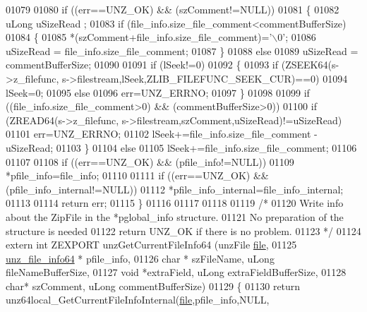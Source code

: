 \begin{DoxyCode}
01079 
01080     \textcolor{keywordflow}{if} ((err==UNZ\_OK) && (szComment!=NULL))
01081     \{
01082         uLong uSizeRead ;
01083         \textcolor{keywordflow}{if} (file\_info.size\_file\_comment<commentBufferSize)
01084         \{
01085             *(szComment+file\_info.size\_file\_comment)=\textcolor{charliteral}{'\(\backslash\)0'};
01086             uSizeRead = file\_info.size\_file\_comment;
01087         \}
01088         \textcolor{keywordflow}{else}
01089             uSizeRead = commentBufferSize;
01090 
01091         \textcolor{keywordflow}{if} (lSeek!=0)
01092         \{
01093             \textcolor{keywordflow}{if} (ZSEEK64(s->z\_filefunc, s->filestream,lSeek,ZLIB\_FILEFUNC\_SEEK\_CUR)==0)
01094                 lSeek=0;
01095             \textcolor{keywordflow}{else}
01096                 err=UNZ\_ERRNO;
01097         \}
01098 
01099         \textcolor{keywordflow}{if} ((file\_info.size\_file\_comment>0) && (commentBufferSize>0))
01100             \textcolor{keywordflow}{if} (ZREAD64(s->z\_filefunc, s->filestream,szComment,uSizeRead)!=uSizeRead)
01101                 err=UNZ\_ERRNO;
01102         lSeek+=file\_info.size\_file\_comment - uSizeRead;
01103     \}
01104     \textcolor{keywordflow}{else}
01105         lSeek+=file\_info.size\_file\_comment;
01106 
01107 
01108     \textcolor{keywordflow}{if} ((err==UNZ\_OK) && (pfile\_info!=NULL))
01109         *pfile\_info=file\_info;
01110 
01111     \textcolor{keywordflow}{if} ((err==UNZ\_OK) && (pfile\_info\_internal!=NULL))
01112         *pfile\_info\_internal=file\_info\_internal;
01113 
01114     \textcolor{keywordflow}{return} err;
01115 \}
01116 
01117 
01118 
01119 \textcolor{comment}{/*}
01120 \textcolor{comment}{  Write info about the ZipFile in the *pglobal\_info structure.}
01121 \textcolor{comment}{  No preparation of the structure is needed}
01122 \textcolor{comment}{  return UNZ\_OK if there is no problem.}
01123 \textcolor{comment}{*/}
01124 \textcolor{keyword}{extern} \textcolor{keywordtype}{int} ZEXPORT unzGetCurrentFileInfo64 (unzFile \hyperlink{structfile}{file},
01125                                           \hyperlink{structunz__file__info64__s}{unz\_file\_info64} * pfile\_info,
01126                                           \textcolor{keywordtype}{char} * szFileName, uLong fileNameBufferSize,
01127                                           \textcolor{keywordtype}{void} *extraField, uLong extraFieldBufferSize,
01128                                           \textcolor{keywordtype}{char}* szComment,  uLong commentBufferSize)
01129 \{
01130     \textcolor{keywordflow}{return} unz64local\_GetCurrentFileInfoInternal(\hyperlink{structfile}{file},pfile\_info,NULL,

\end{DoxyCode}
